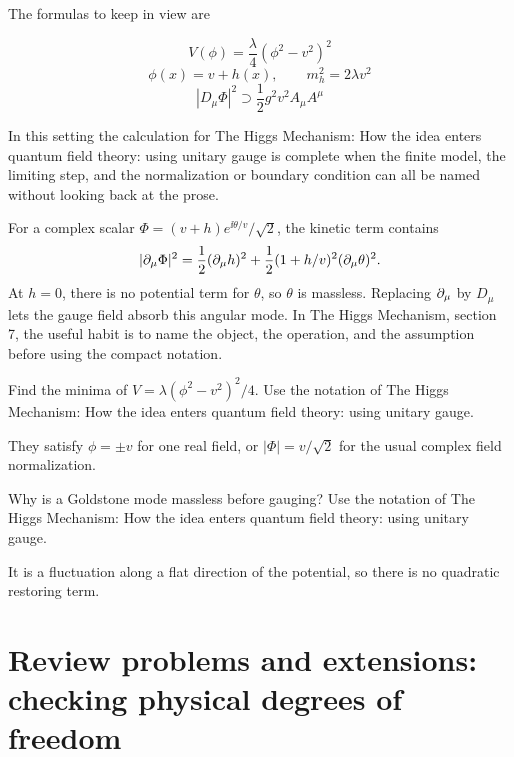 The formulas to keep in view are

\[
  V(\phi)=\frac{\lambda}{4}(\phi^2-v^2)^2
\]
\[
  \phi(x)=v+h(x),\qquad m_h^2=2\lambda v^2
\]
\[
  |D_\mu\Phi|^2\supset \frac12g^2v^2A_\mu A^\mu
\]

In this setting the calculation for The Higgs Mechanism: How the idea enters quantum field theory: using unitary gauge is complete when the finite model, the limiting step, and the normalization or boundary condition can all be named without looking back at the prose.




\begin{example}
For a complex scalar \(\Phi=(v+h)e^{\ii\theta/v}/\sqrt2\), the kinetic term contains
\[
  |\partial_\mu\Phi|^2=\frac12(\partial_\mu h)^2+\frac12(1+h/v)^2(\partial_\mu\theta)^2.
\]
At \(h=0\), there is no potential term for \(\theta\), so \(\theta\) is massless.  Replacing \(\partial_\mu\) by \(D_\mu\) lets the gauge field absorb this angular mode.  In The Higgs Mechanism, section 7, the useful habit is to name the object, the operation, and the assumption before using the compact notation.
\end{example}



\begin{exercise}
Find the minima of \(V=\lambda(\phi^2-v^2)^2/4\).  Use the notation of The Higgs Mechanism: How the idea enters quantum field theory: using unitary gauge.
\begin{answer}
They satisfy \(\phi=\pm v\) for one real field, or \(|\Phi|=v/\sqrt2\) for the usual complex field normalization.
\end{answer}
\end{exercise}

\begin{exercise}
Why is a Goldstone mode massless before gauging?  Use the notation of The Higgs Mechanism: How the idea enters quantum field theory: using unitary gauge.
\begin{answer}
It is a fluctuation along a flat direction of the potential, so there is no quadratic restoring term.
\end{answer}
\end{exercise}



\section{Review problems and extensions: checking physical degrees of freedom}

